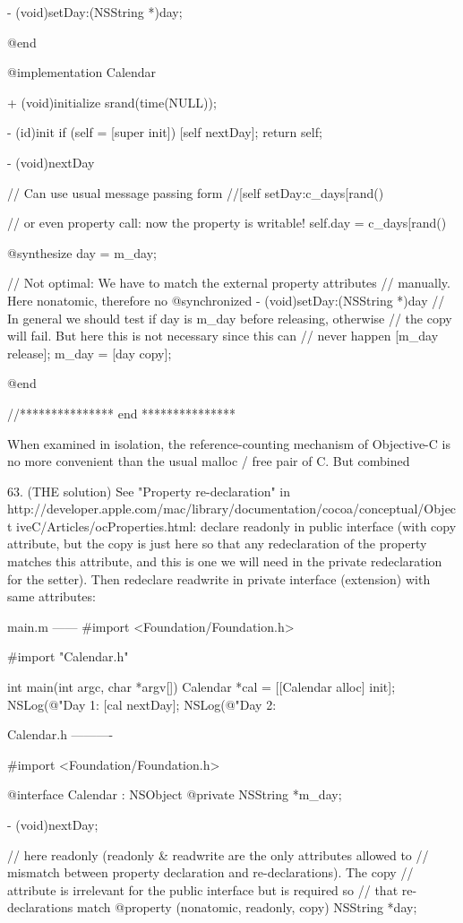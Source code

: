 - (void)setDay:(NSString *)day;

@end

@implementation Calendar

+ (void)initialize
{
 srand(time(NULL));
}

- (id)init
{
 if (self = [super init]) {
   [self nextDay];
 }
 return self;
}

- (void)nextDay
{
 // Can use usual message passing form
 //[self setDay:c_days[rand() %

 // or even property call: now the property is writable!
 self.day = c_days[rand() %
}

@synthesize day = m_day;

// Not optimal: We have to match the external property attributes
// manually. Here nonatomic, therefore no @synchronized
- (void)setDay:(NSString *)day
{
 // In general we should test if day is m_day before releasing, otherwise
 // the copy will fail. But here this is not necessary since this can
 // never happen
 [m_day release];
 m_day = [day copy];
}

@end

//*************** end ***************

When examined in isolation, the reference-counting mechanism of Objective-C is no more convenient than the usual malloc / free pair of C. But combined 

63. (THE solution) See "Property re-declaration" in
http://developer.apple.com/mac/library/documentation/cocoa/conceptual/Object
iveC/Articles/ocProperties.html: declare readonly in public interface (with
copy attribute, but the copy is just here so that any redeclaration of the
property matches this attribute, and this is one we will need in the private
redeclaration for the setter). Then redeclare readwrite in private interface
(extension) with same attributes:


main.m
------
#import <Foundation/Foundation.h>

#import "Calendar.h"

int main(int argc, char *argv[])
{
 Calendar *cal = [[Calendar alloc] init];
 NSLog(@"Day 1: %
 [cal nextDay];
 NSLog(@"Day 2: %
}


Calendar.h
----------

#import <Foundation/Foundation.h>

@interface Calendar : NSObject {
@private
 NSString *m_day;
}

- (void)nextDay;

// here readonly (readonly & readwrite are the only attributes allowed to
// mismatch between property declaration and re-declarations). The copy
// attribute is irrelevant for the public interface but is required so
// that re-declarations match
@property (nonatomic, readonly, copy) NSString *day;

